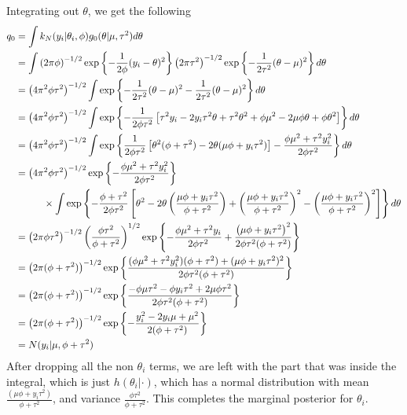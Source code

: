 \documentclass[a4paper, 10pt]{article}
\newcommand\tab[1][1cm]{\hspace*{#1}}
\newcommand{\kNormal}{k_N(\yi| \thi, \phi)}
\newcommand{\yi}{y_i}
\newcommand{\mfrac}{\frac{\mu \phi +\yi\tausq}{\phi + \tausq} }
\newcommand{\thi}{\theta_i}
\newcommand{\thetsq}{\theta^2}
\newcommand{\tausq}{\tau^2}
\newcommand{\phiplustau}{\phi+\tausq}
\newcommand{\parenth}[1]{\left(#1\right)}
\newcommand{\bkSquares}[1]{\left[#1\right]}
\newcommand{\curlies}[1]{ \left\{#1\right\} }
\begin{document}
\begin{enumerate}
\begin{enumerate}
        Integrating out $\theta$, we get the following
        \begin{align*}
            q_0  &= \int \kNormal g_0(\theta|\mu, \tausq) d\theta \\
                &= \int \parenth{2\pi \phi}^{-1/2} \exp \curlies{-\frac{1}{2\phi} (\yi -\theta)^2 }\parenth{2\pi\tausq}^{-1/2} \exp \curlies{- \frac{1}{2\tausq} (\theta - \mu)^2} d\theta\\
                &= \parenth{4\pi^2\phi\tausq}^{-1/2} \int \exp \curlies{ - \frac{1}{2\tausq} (\theta - \mu)^2 - \frac{1}{2\tausq} (\theta - \mu)^2 } d\theta\\
                &= \parenth{4\pi^2\phi\tausq}^{-1/2} \int \exp \curlies{ -\frac{1}{2\phi\tausq} \bkSquares{ \tausq \yi - 2\yi \tausq \theta + \tausq\theta^2 + \phi\mu^2 - 2\mu\phi\theta + \phi\theta^2 } } d\theta\\
                &= \parenth{4\pi^2\phi\tausq}^{-1/2} \int \exp \curlies{ \frac{1}{2\phi\tausq} \bkSquares{ \thetsq(\phi + \tausq) - 2\theta(\mu\phi + \yi\tausq ) } - \frac{\phi\mu^2 + \tausq \yi^2}{2\phi\tausq} }d\theta\\
                &= \parenth{4\pi^2\phi\tausq}^{-1/2} \exp \curlies{- \frac{\phi \mu^2 +\tausq \yi^2}{2\phi\tausq} }\\
                &\tab\times\int \exp \curlies{- \frac{\phi + \tausq}{ 2 \phi \tausq  }\bkSquares{\thetsq - 2\theta \parenth{\mfrac } + \parenth{\mfrac}^2 -  \parenth{\mfrac}^2 } }d\theta\\
                &=\parenth{2\pi\phi\tausq}^{-1/2}\parenth{\frac{\phi \tausq}{\phi + \tausq}}^{1/2}\exp \curlies{- \frac{\phi\mu^2 + \tausq \yi}{2\phi\tausq} + 
                            \frac{ \parenth{\mu\phi + \yi\tausq}^2 }{2\phi\tausq(\phi +\tausq)} }\\
                &= \parenth{2\pi(\phi+\tausq)}^{-1/2} \exp \curlies{ \frac{(\phi\mu^2 + \tausq \yi^2)(\phiplustau) + (\mu\phi + \yi\tausq)^2}{2\phi \tausq(\phiplustau) } }\\
                &= \parenth{2\pi(\phi+\tausq)}^{-1/2} \exp \curlies{ \frac{-\phi\mu\tausq - \phi\yi\tausq + 2\mu\phi\tausq}{2\phi \tausq(\phiplustau)}}\\
                &=\parenth{2\pi(\phi+\tausq)}^{-1/2} \exp \curlies{ - \frac{\yi^2 - 2\yi \mu + \mu^2}{2(\phiplustau)}}\\
                &= N(\yi|\mu,\phiplustau)
        \end{align*}
        After dropping all the non $\thi$ terms, we are left with the part that was inside the integral, which is just $h(\thi|\cdot)$, which has a normal distribution with mean $\frac{(\mu\phi+ \yi\tausq)}{\phiplustau}$, and variance $\frac{\phi\tausq}{\phiplustau}$. This completes the marginal posterior for $\thi$.


\end{enumerate}
\end{enumerate}
\end{document}
